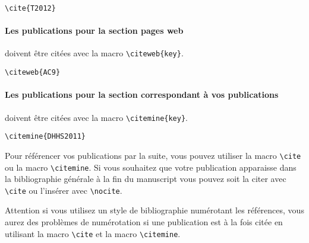 \begin{framed}
\noindent\cite{T2012}\vspace{-0.5em}
\begin{verbatim}\cite{T2012}\end{verbatim}\vspace{-0.75em}
\end{framed}

\paragraph{Les publications pour la section pages web} doivent être citées avec la macro \texttt{\textbackslash citeweb\{key\}}.

\begin{framed}
\noindent{} \vspace{-0.5em}
\begin{verbatim}\citeweb{AC9}\end{verbatim}\vspace{-0.75em}
\end{framed}

\paragraph{Les publications pour la section correspondant à vos publications} doivent être citées avec la macro \texttt{\textbackslash citemine\{key\}}.

\begin{framed}
\noindent{} \vspace{-0.5em}
\begin{verbatim}\citemine{DHHS2011}\end{verbatim}\vspace{-0.75em}
\end{framed}

Pour référencer vos publications par la suite, vous pouvez utiliser la macro \texttt{\textbackslash cite} ou la macro \texttt{\textbackslash citemine}.
Si vous souhaitez que votre publication apparaisse dans la bibliographie générale à la fin du manuscript vous pouvez soit la citer avec \texttt{\textbackslash cite} ou l'insérer avec \texttt{\textbackslash nocite}. \nocite{DHHS2011} 

Attention si vous utilisez un style de bibliographie numérotant les références, vous aurez des problèmes de numérotation si une publication est à la fois citée en utilisant la macro \texttt{\textbackslash cite} et la macro \texttt{\textbackslash citemine}.



